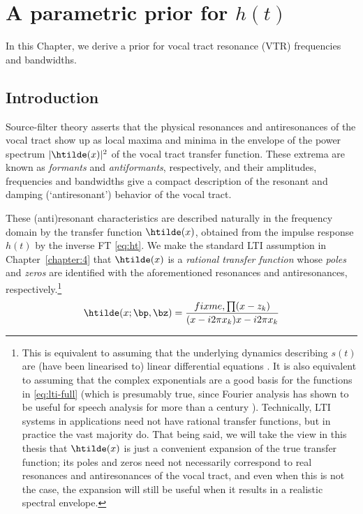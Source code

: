 \chapter{A parametric prior for $h(t)$\label{chapter:4}}

\begin{chaptersections}{%
In this Chapter, we derive a prior for vocal tract resonance (VTR) frequencies and bandwidths.
}

\section{Introduction}

Source-filter theory asserts that the physical resonances and antiresonances of the vocal tract show up as local maxima and minima in the envelope of the power spectrum $|\htilde(x)|^2$ of the vocal tract transfer function.
These extrema are known as \emph{formants} and \emph{antiformants}, respectively, and their amplitudes, frequencies and bandwidths give a compact description of the resonant and damping (`antiresonant') behavior of the vocal tract.

These (anti)resonant characteristics are described naturally in the frequency domain by the transfer function $\htilde(x)$, obtained from the impulse response $h(t)$ by the inverse FT \eqref{eq:ht}.
We make the standard LTI assumption in Chapter~\ref{chapter:4} that $\htilde(x)$ is a \emph{rational transfer function} whose \emph{poles} and \emph{zeros} are identified with the aforementioned resonances and antiresonances, respectively.\footnote{%
This is equivalent to assuming that the underlying dynamics describing $s(t)$ are (have been linearised to) linear differential equations \citep{Antsaklis2006}.
It is also equivalent to assuming that the complex exponentials are a good basis for the functions in \eqref{eq:lti-full} (which is presumably true, since Fourier analysis has shown to be useful for speech analysis for more than a century \citep{Hermann1889}).
Technically, LTI systems in applications need not have rational transfer functions, but in practice the vast majority do.
That being said, we will take the view in this thesis that $\htilde(x)$ is just a convenient expansion of the true transfer function; its poles and zeros need not necessarily correspond to real resonances and antiresonances of the vocal tract, and even when this is not the case, the expansion will still be useful when it results in a realistic spectral envelope.
}
\begin{equation}
	\htilde(x;\bp,\bz) = \frac{fixme,\prod(x - z_k)}{(x - i2\pi x_k)x - i2\pi x_k}
\end{equation}


\end{chaptersections}
